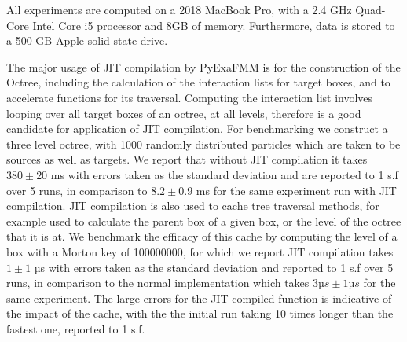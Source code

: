 All experiments are computed on a 2018 MacBook Pro, with a 2.4 GHz Quad-Core
Intel Core i5 processor and 8GB of memory. Furthermore, data is stored to a
500 GB Apple solid state drive.

The major usage of \gls{JIT} compilation by \gls{PyExaFMM} is for the construction
of the Octree, including the calculation of the interaction lists for target
boxes, and to accelerate functions for its traversal. Computing the interaction list
involves looping over all target boxes of an octree, at all levels, therefore
is a good candidate for application of \gls{JIT} compilation. For benchmarking
we construct a three level octree, with 1000 randomly distributed particles which are
taken to be sources as well as targets. We report that without \gls{JIT} compilation
it takes $380 \pm 20$ ms with errors taken as the standard deviation
and are reported to 1 s.f over 5 runs, in comparison
to $8.2 \pm 0.9$ ms for the same experiment run with \gls{JIT} compilation.
\gls{JIT} compilation is also used to cache tree traversal methods, for example
used to calculate the parent box of a given box, or the level of the octree that
it is at. We benchmark the efficacy of this cache by computing the level
of a box with a Morton key of 100000000, for which we report \gls{JIT} compilation
takes $1 \pm 1$ µs with errors taken as the standard deviation and reported
to 1 s.f over 5 runs, in comparison to the normal implementation which takes
$3 µs ± 1 µs$ for the same experiment. The large errors for the \gls{JIT} compiled
function is indicative of the impact of the cache, with the the initial
run taking 10 times longer than the fastest one, reported to 1 s.f.

